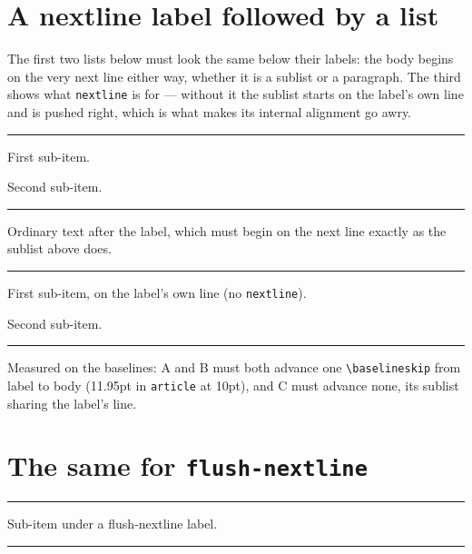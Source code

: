\documentclass{article}
\begin{document}
\section{A nextline label followed by a list}

The first two lists below must look the same below their labels: the body
begins on the very next line either way, whether it is a sublist or a
paragraph.  The third shows what \verb|nextline| is for --- without it the
sublist starts on the label's own line and is pushed right, which is what makes
its internal alignment go awry.

\noindent\rule{\textwidth}{0.3pt}
\begin{prop}
  \item[Label A, align=nextline]
  \begin{prop}
    \item First sub-item.
    \item Second sub-item.
  \end{prop}
\end{prop}
\noindent\rule{\textwidth}{0.3pt}
\begin{prop}
  \item[Label B, align=nextline] Ordinary text after the label, which must
  begin on the next line exactly as the sublist above does.
\end{prop}
\noindent\rule{\textwidth}{0.3pt}
\begin{prop}
  \item[Label C]
  \begin{prop}
    \item First sub-item, on the label's own line (no \texttt{nextline}).
    \item Second sub-item.
  \end{prop}
\end{prop}
\noindent\rule{\textwidth}{0.3pt}

Measured on the baselines: A and B must both advance one \verb|\baselineskip|
from label to body (11.95pt in \texttt{article} at 10pt), and C must advance
none, its sublist sharing the label's line.

\section{The same for \texttt{flush-nextline}}

\noindent\rule{\textwidth}{0.3pt}
\begin{prop}
  \item[Label D, align=flush-nextline]
  \begin{prop}
    \item Sub-item under a flush-nextline label.
  \end{prop}
\end{prop}
\noindent\rule{\textwidth}{0.3pt}
\end{document}
